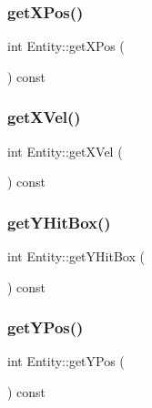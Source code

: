 \subsubsection{\texorpdfstring{get\+X\+Pos()}{getXPos()}}
{\footnotesize\ttfamily int Entity\+::get\+X\+Pos (\begin{DoxyParamCaption}{ }\end{DoxyParamCaption}) const\hspace{0.3cm}{\ttfamily [inline]}}

\mbox{\label{class_entity_a31c55ae9457507b1c3ad5688b8f2eda2}} 
\subsubsection{\texorpdfstring{get\+X\+Vel()}{getXVel()}}
{\footnotesize\ttfamily int Entity\+::get\+X\+Vel (\begin{DoxyParamCaption}{ }\end{DoxyParamCaption}) const\hspace{0.3cm}{\ttfamily [inline]}}

\mbox{\label{class_entity_ad46d1d4faf814a6b501101bc1c914754}} 
\subsubsection{\texorpdfstring{get\+Y\+Hit\+Box()}{getYHitBox()}}
{\footnotesize\ttfamily int Entity\+::get\+Y\+Hit\+Box (\begin{DoxyParamCaption}{ }\end{DoxyParamCaption}) const\hspace{0.3cm}{\ttfamily [inline]}}

\mbox{\label{class_entity_a8dc5891871faff09d565738104e1d42f}} 
\subsubsection{\texorpdfstring{get\+Y\+Pos()}{getYPos()}}
{\footnotesize\ttfamily int Entity\+::get\+Y\+Pos (\begin{DoxyParamCaption}{ }\end{DoxyParamCaption}) const\hspace{0.3cm}{\ttfamily [inline]}}

